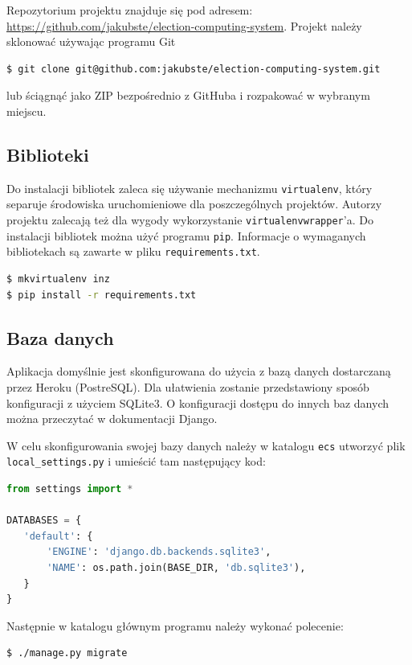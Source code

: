 \documentclass{../aghdoc}               %
\begin{document}
Repozytorium projektu znajduje się pod adresem: \\ \url{https://github.com/jakubste/election-computing-system}.
Projekt należy sklonować używając programu Git 
\begin{lstlisting}[language=bash]
$ git clone git@github.com:jakubste/election-computing-system.git
\end{lstlisting}
lub ściągnąć jako ZIP bezpośrednio z GitHuba i rozpakować w wybranym miejscu.

\subsection{Biblioteki}
\label{subsec:repo}

Do instalacji bibliotek zaleca się używanie mechanizmu \texttt{virtualenv}, który separuje środowiska uruchomieniowe dla poszczególnych projektów. Autorzy projektu zalecają też dla wygody wykorzystanie \texttt{virtualenvwrapper}'a. Do instalacji bibliotek można użyć programu \texttt{pip}.
Informacje o wymaganych bibliotekach są zawarte w pliku \texttt{requirements.txt}.
\begin{lstlisting}[language=bash]
$ mkvirtualenv inz
$ pip install -r requirements.txt
\end{lstlisting}

\subsection{Baza danych}
\label{subsec:database}

Aplikacja domyślnie jest skonfigurowana do użycia z bazą danych dostarczaną przez Heroku (PostreSQL). Dla ułatwienia zostanie przedstawiony sposób konfiguracji z użyciem SQLite3. O konfiguracji dostępu do innych baz danych można przeczytać w dokumentacji Django. 

W celu skonfigurowania swojej bazy danych należy w katalogu \texttt{ecs} utworzyć 
plik \texttt{local\_settings.py} i umieścić tam następujący kod:

\begin{lstlisting}[language=Python]
from settings import *

DATABASES = {
   'default': {
       'ENGINE': 'django.db.backends.sqlite3',
       'NAME': os.path.join(BASE_DIR, 'db.sqlite3'),
   }
}
\end{lstlisting}

Następnie w katalogu głównym programu należy wykonać polecenie:
\begin{lstlisting}[language=bash]
$ ./manage.py migrate
\end{lstlisting}
\end{document}
